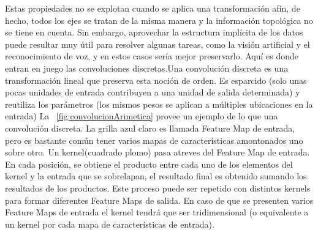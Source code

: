 Estas propiedades no se explotan cuando se aplica una transformación afín, de hecho, todos los ejes se tratan de la misma manera y la información topológica no se tiene en cuenta. Sin embargo, aprovechar la estructura implícita de los datos puede resultar muy útil para resolver algunas tareas, como la visión artificial y el reconocimiento de voz, y en estos casos sería mejor preservarlo. Aquí es donde entran en juego las convoluciones discretas.Una convolución discreta es una transformación lineal que preserva esta noción de orden. Es esparcido (solo unas pocas unidades de entrada contribuyen a una unidad de salida determinada) y reutiliza los parámetros (los mismos pesos se aplican a múltiples ubicaciones en la entrada)
La \figurename~\ref{fig:convolucionArimetica} provee un ejemplo de lo que una convolución discreta. La grilla azul claro es llamada \gls{Feature Map} de entrada, pero es bastante común tener varios mapas de características amontonados uno sobre otro. Un \gls{kernel}(cuadrado plomo) pasa atreves del \gls{Feature Map} de entrada. En cada posición, se obtiene el producto entre cada uno de los elementos del \gls{kernel} y la entrada que se sobrelapan, el resultado final es obtenido sumando los resultados de los productos. Este proceso puede ser repetido con distintos \gls{kernel}s para formar diferentes \gls{Feature Map}s de salida. En caso de que se presenten varios \gls{Feature Map}s de entrada el \gls{kernel} tendrá que ser tridimensional (o equivalente a un \gls{kernel} por cada mapa de características de entrada).


